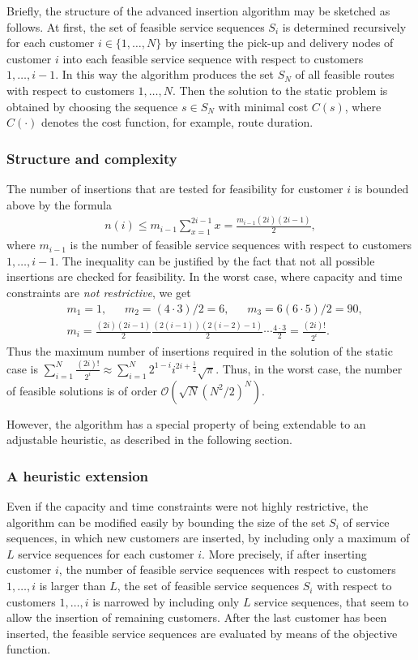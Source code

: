 \documentclass[dissertation,draft*]{aaltoseries}
\begin{document}
Briefly, the structure of the advanced insertion algorithm may be sketched as follows.
At first, the set of feasible service sequences $S_i$ is determined recursively
for each customer $i \in \{1, \ldots, N\}$ by inserting the pick-up and delivery nodes of customer $i$ into each feasible
service sequence with respect to customers $1,\ldots,i-1$. In this way the algorithm 
produces the set $S_N$ of all feasible routes with respect to customers $1,\ldots,N$. 
Then the solution to the static problem is obtained by choosing the sequence $s \in S_N$ with
minimal cost $C(s)$, where $C(\cdot)$ denotes the cost function, for example, route duration. 

\subsubsection{Structure and complexity}
The number of insertions that are tested for feasibility for customer $i$ is bounded above 
by the formula
\begin{align}
n(i) \leq m_{i-1} \sum_{x=1}^{2i-1} x  = \frac{m_{i-1}(2i)(2i-1)}{2},
\end{align}
where $m_{i-1}$ is the number of feasible service sequences with respect to customers $1, \ldots,i-1$.
The inequality can be justified by the fact that not all possible insertions  
are checked for feasibility. 
In the worst case, where capacity and time constraints are \emph{not restrictive},
we get 
\begin{align*}
& m_1 = 1, \ \ \ \ \ \ \ m_2 = (4 \cdot 3)/2 = 6,  \ \ \ \ \ \ \ m_3 = 6(6 \cdot 5)/2 = 90, \\
& m_i = \frac{(2i)(2i-1)}{2} \frac{(2(i-1))(2(i-2)-1)}{2} \cdots \frac{4 \cdot 3}{2} = \frac{(2i)!}{2^i}. 
\end{align*}
Thus the maximum number of insertions required in the solution of the static case is
$\sum_{i=1}^{N}\frac{(2i)!}{2^i} \approx \sum_{i=1}^{N} {2^{1-i} i^{2i + \frac 12} \sqrt{\pi}}$.
Thus, in the worst case, the number of feasible solutions is of order
$\mathcal{O}(\sqrt{N} (N^2/2)^N)$.

However, the 
algorithm has a special property of being extendable to an adjustable heuristic,
as described in the following section.

\subsubsection{A heuristic extension}
\label{svheuristic}
Even if the capacity and time constraints were not highly restrictive, the algorithm can be 
modified easily by bounding the size of the set $S_i$ 
of service sequences, in which new customers are inserted, 
by including only a maximum of $L$ service sequences
for each customer $i$. More precisely, if after inserting 
customer $i$, the number of feasible service sequences with respect to customers $1,\ldots, i$
is larger than $L$, the set of feasible service sequences $S_i$ with respect to 
customers $1,\ldots, i$ is narrowed by including only $L$  
service sequences, that seem to allow the insertion of remaining customers.
After the last customer has been inserted, the feasible service sequences are evaluated
by means of the objective function.
\end{document}
